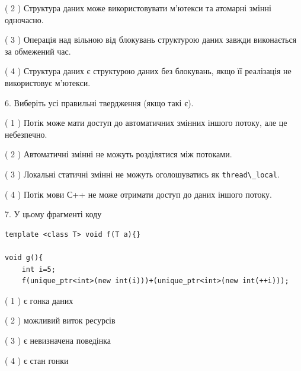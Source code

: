 \documentclass[12pt, ukrainian]{article}
\def\code#1{\Verb!#1!}
\begin{document}
\begin {large}
{( 2 ) Структура даних може використовувати м’ютекси та атомарні змінні одночасно.%

( 3 ) Операція над вільною від блокувань структурою даних завжди виконається за обмежений час.%

( 4 ) Структура даних є структурою даних без блокувань, якщо її реалізація не використовує м’ютекси.%
\newpage



\vspace{5mm}
6. Виберіть усі правильні твердження (якщо такі є).\par
\vspace{2mm}

( 1 ) Потік може мати доступ до автоматичних змінних іншого потоку, але це небезпечно.%

( 2 ) Автоматичні змінні не можуть розділятися між потоками.%

( 3 ) Локальні статичні змінні не можуть оголошуватись як \code{thread\_local}.%

( 4 ) Потік мови С++ не може отримати доступ до даних іншого потоку.%


\vspace{5mm}
7. У цьому фрагменті коду
\begin{verbatim}
template <class T> void f(T a){}

void g(){
    int i=5;
    f(unique_ptr<int>(new int(i)))+(unique_ptr<int>(new int(++i)));
\end{verbatim}
( 1 ) є гонка даних%

( 2 ) можливий виток ресурсів%

( 3 ) є невизначена поведінка%

( 4 ) є стан гонки%
}
\end {large}
\end{document}
